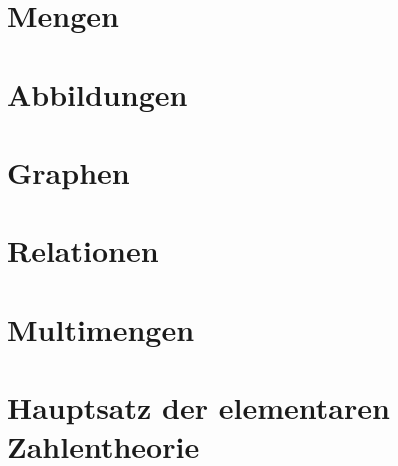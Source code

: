 \documentclass[a4paper,12pt, DIV12]{scrartcl}
\begin{document}

\newpage
\tableofcontents
\newpage
\section{Mengen}

\newpage


\newpage
\section{Abbildungen}

\newpage

\newpage

\newpage


\newpage
\section{Graphen}

\newpage

\newpage


\newpage
\section{Relationen}


\newpage
\section{Multimengen}


\newpage
\section{Hauptsatz der elementaren Zahlentheorie}

\end{document}
